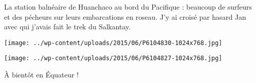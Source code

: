La station balnéaire de Huanchaco au bord du Pacifique : beaucoup de surfeurs et des pécheurs sur leurs embarcations en roseau. J'y ai croisé par hasard Jan avec qui j'avais fait le trek du Salkantay. 
\begin{center} \texttt{[image: ../wp-content/uploads/2015/06/P6104830-1024x768.jpg]} \end{center}
\begin{center} \texttt{[image: ../wp-content/uploads/2015/06/P6104827-1024x768.jpg]} \end{center}

\`A bientôt en Équateur !
